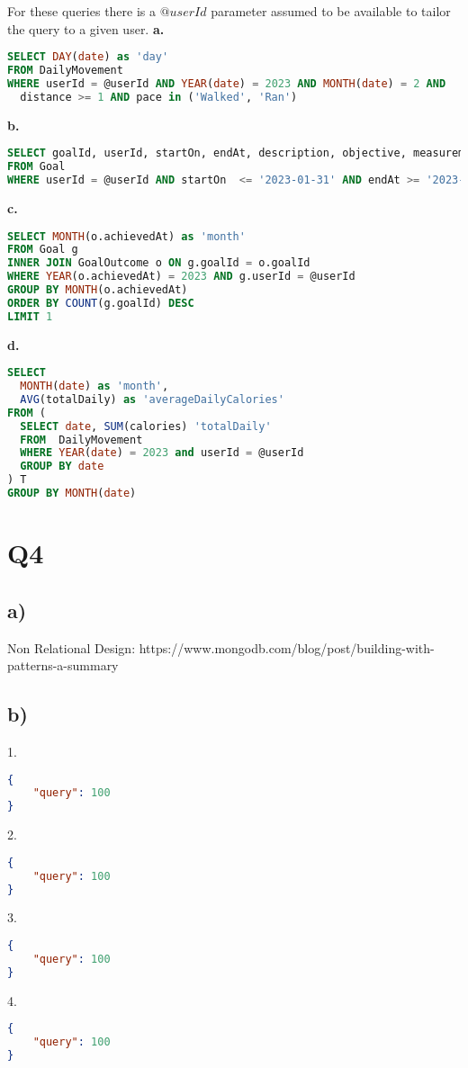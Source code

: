 \documentclass{article}
\begin{document}
For these queries there is a $@userId$ parameter assumed to be available to tailor the query to a given user.
\textbf{\small{a.}}
\begin{lstlisting}[language=sql]
SELECT DAY(date) as 'day'
FROM DailyMovement 
WHERE userId = @userId AND YEAR(date) = 2023 AND MONTH(date) = 2 AND 
  distance >= 1 AND pace in ('Walked', 'Ran')
\end{lstlisting}
\textbf{\small{b.}}
\begin{lstlisting}[language=sql]
SELECT goalId, userId, startOn, endAt, description, objective, measurement, target
FROM Goal 
WHERE userId = @userId AND startOn  <= '2023-01-31' AND endAt >= '2023-01-01'
\end{lstlisting}
\textbf{\small{c.}}
\begin{lstlisting}[language=sql]
SELECT MONTH(o.achievedAt) as 'month'
FROM Goal g
INNER JOIN GoalOutcome o ON g.goalId = o.goalId
WHERE YEAR(o.achievedAt) = 2023 AND g.userId = @userId
GROUP BY MONTH(o.achievedAt)
ORDER BY COUNT(g.goalId) DESC
LIMIT 1
\end{lstlisting}
\textbf{\small{d.}}
\begin{lstlisting}[language=sql]
SELECT 
  MONTH(date) as 'month', 
  AVG(totalDaily) as 'averageDailyCalories'
FROM (
  SELECT date, SUM(calories) 'totalDaily'
  FROM  DailyMovement 
  WHERE YEAR(date) = 2023 and userId = @userId
  GROUP BY date
) T
GROUP BY MONTH(date)
\end{lstlisting}

\pagebreak

\section*{Q4}

\subsection*{\small a)}

Non Relational Design: https://www.mongodb.com/blog/post/building-with-patterns-a-summary

\subsection*{\small b)}

\hspace{0cm}1.
\begin{lstlisting}[language=json]
{
    "query": 100
} 
\end{lstlisting} 
\hspace{0cm}2.
\begin{lstlisting}[language=json]
{                   
    "query": 100
}
\end{lstlisting}
\hspace{0cm}3. 
\begin{lstlisting}[language=json]
{
    "query": 100
}
\end{lstlisting}
\hspace{0cm}4. 
\begin{lstlisting}[language=json]
{
    "query": 100
}
\end{lstlisting}
\end{document}
